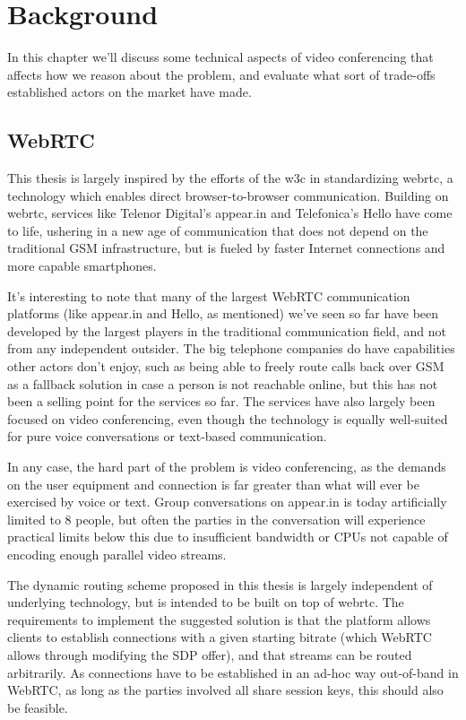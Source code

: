\chapter{Background}
\label{chp:background}

In this chapter we'll discuss some technical aspects of video conferencing that affects how we reason about the problem, and evaluate what sort of trade-offs established actors on the market have made.

\section{WebRTC}

This thesis is largely inspired by the efforts of the \gls{w3c} in standardizing \gls{webrtc}, a technology which enables direct browser-to-browser communication. Building on \gls{webrtc}, services like Telenor Digital's appear.in and Telefonica's Hello have come to life, ushering in a new age of communication that does not depend on the traditional GSM infrastructure, but is fueled by faster Internet connections and more capable smartphones.

It's interesting to note that many of the largest WebRTC communication platforms (like appear.in and Hello, as mentioned) we've seen so far have been developed by the largest players in the traditional communication field, and not from any independent outsider. The big telephone companies do have capabilities other actors don't enjoy, such as being able to freely route calls back over GSM as a fallback solution in case a person is not reachable online, but this has not been a selling point for the services so far. The services have also largely been focused on video conferencing, even though the technology is equally well-suited for pure voice conversations or text-based communication.

In any case, the hard part of the problem is video conferencing, as the demands on the user equipment and connection is far greater than what will ever be exercised by voice or text. Group conversations on appear.in is today artificially limited to 8 people, but often the parties in the conversation will experience practical limits below this due to insufficient bandwidth or CPUs not capable of encoding enough parallel video streams.

The dynamic routing scheme proposed in this thesis is largely independent of underlying technology, but is intended to be built on top of \gls{webrtc}. The requirements to implement the suggested solution is that the platform allows clients to establish connections with a given starting bitrate (which WebRTC allows through modifying the SDP offer), and that streams can be routed arbitrarily. As connections have to be established in an ad-hoc way out-of-band in WebRTC, as long as the parties involved all share session keys, this should also be feasible.

